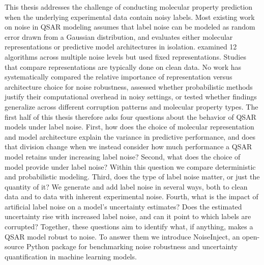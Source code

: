 This thesis addresses the challenge of conducting molecular property prediction when the underlying experimental data contain noisy labels. Most existing work on noise in QSAR modeling assumes that label noise can be modeled as random error drawn from a Gaussian distribution, and evaluates either molecular representations or predictive model architectures in isolation. \citet{Cortes2015} examined 12 algorithms across multiple noise levels but used fixed representations. Studies that compare representations are typically done on clean data. No work has systematically compared the relative importance of representation versus architecture choice for noise robustness, assessed whether probabilistic methods justify their computational overhead in noisy settings, or tested whether findings generalize across different corruption patterns and molecular property types. The first half of this thesis therefore asks four questions about the behavior of QSAR models under label noise.\label{sec:intro:questions} First, how does the choice of molecular representation and model architecture explain the variance in predictive performance, and does that division change when we instead consider how much performance a QSAR model retains under increasing label noise? Second, what does the choice of model provide under label noise? Within this question we compare deterministic and probabilistic modeling. Third, does the type of label noise matter, or just the quantity of it? We generate and add label noise in several ways, both to clean data and to data with inherent experimental noise. Fourth, what is the impact of artificial label noise on a model's uncertainty estimates? Does the estimated uncertainty rise with increased label noise, and can it point to which labels are corrupted? Together, these questions aim to identify what, if anything, makes a QSAR model robust to noise. To answer them we introduce NoiseInject, an open-source Python package for benchmarking noise robustness and uncertainty quantification in machine learning models.


